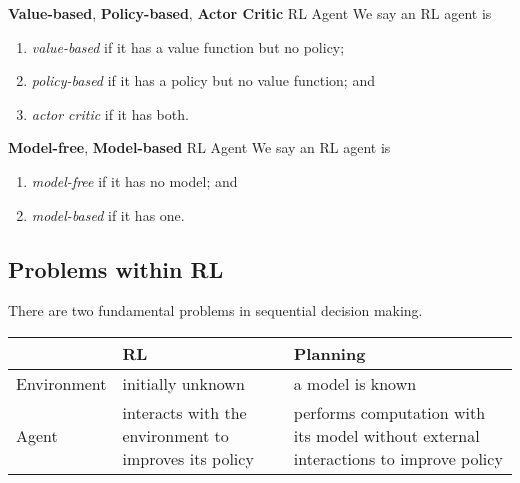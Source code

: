 \documentclass[RL]{subfile}
\begin{document}
    \begin{definition}{\textbf{Value-based}, \textbf{Policy-based}, \textbf{Actor Critic} RL Agent}
        We say an RL agent is
        \begin{enumerate}
            \item \emph{value-based} if it has a value function but no policy;\footnotemark[1]
            \item \emph{policy-based} if it has a policy but no value function; and
            \item \emph{actor critic} if it has both.
        \end{enumerate}
        
        \noindent
        \begin{minipage}{\textwidth}
        \end{minipage}
    \end{definition}

    \begin{definition}{\textbf{Model-free}, \textbf{Model-based} RL Agent}
        We say an RL agent is
        \begin{enumerate}
            \item \emph{model-free} if it has no model; and
            \item \emph{model-based} if it has one.
        \end{enumerate}
    \end{definition}

    \subsection{Problems within RL}

    There are two fundamental problems in sequential decision making.

    \noindent
    \begin{tabularx}{\textwidth}{|X|Y|Y|}
        \hline
        & RL & Planning \\
        \hline
        Environment & initially unknown & a model is known \\
        \hline
        Agent & interacts with the environment to improves its policy & performs computation with its model without external interactions to improve policy \\
        \hline
    \end{tabularx}
\end{document}
